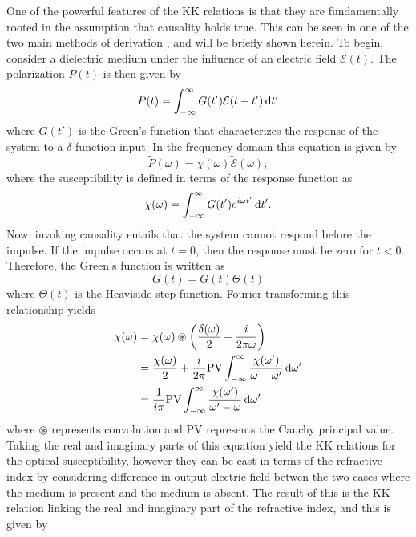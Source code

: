 One of the powerful features of the KK relations is that they are fundamentally rooted in the assumption that causality holds true.  This can be seen in one of the two main methods of derivation \cite{hutchingsKramersKronigRelationsNonlinear1992, jacksonClassicalElectrodynamics1999, arfkenMathematicalMethodsPhysicists2013}, and will be briefly shown herein.   To begin, consider a dielectric medium under the influence of an electric field $\mathcal{E}(t)$.  The polarization $P(t)$ is then given by
\begin{equation}
	P(t)=\int_{-\infty}^{\infty}G(t')\mathcal{E}(t-t') \mathop{}\!\mathrm{d} t'
\end{equation} 
where $G(t')$ is the Green's function that characterizes the response of the system to a $\delta$-function input.  In the frequency domain this equation is given by
\begin{equation}
	\tilde{P}(\omega)=\chi(\omega)\tilde{\mathcal{E}}(\omega),
\end{equation}
where the susceptibility is defined in terms of the response function as
\begin{equation}
	\chi(\omega)=\int_{-\infty}^{\infty}G(t')e^{i\omega t'}\mathop{}\!\mathrm{d} t'.
\end{equation}
Now, invoking causality entails that the system cannot respond before the impulse.  If the impulse occurs at $t=0$, then the response must be zero for $t<0$.  Therefore, the Green's function is written as
\begin{equation}
	G(t)=G(t)\Theta(t)
\end{equation}
where $\Theta(t)$ is the Heaviside step function.  Fourier transforming this relationship yields
\begin{equation}
	\begin{aligned}
		\chi(\omega) &= \chi(\omega) \circledast \bigg(\frac{\delta(\omega)}{2} + \frac{i}{2\pi\omega}\bigg)\\
		& = \frac{\chi(\omega)}{2} + \frac{i}{2\pi} \mathrm{PV} \int_{-\infty}^{\infty}\frac{\chi(\omega')}{\omega - \omega'}\mathop{}\!\mathrm{d}\omega'\\
		& = \frac{1}{i\pi} \mathrm{PV} \int_{-\infty}^{\infty}\frac{\chi(\omega')}{\omega' - \omega} \mathop{}\!\mathrm{d} \omega'
	\end{aligned}
\end{equation}
where $\circledast$ represents convolution and  $\mathrm{PV}$ represents the Cauchy principal value.  Taking the real and imaginary parts of this equation yield the KK relations for the optical susceptibility, however they can be cast in terms of the refractive index by considering difference in output electric field betwen the two cases where the medium is present and the medium is absent.  The result of this is the KK relation linking the real and imaginary part of the refractive index, and this is given by
